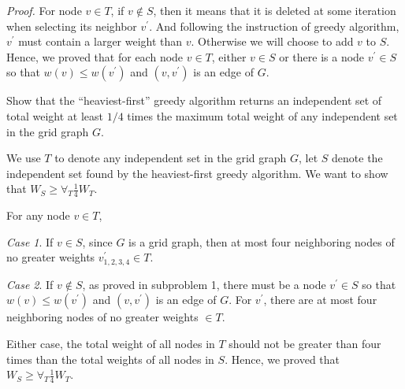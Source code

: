


\textit{Proof.} For node $v\in T$, if $v \notin S$, then it means that it is deleted at some iteration when selecting its neighbor $v^\prime$. And following the instruction of greedy algorithm, $v^\prime$ must contain a larger weight than $v$. Otherwise we will choose to add $v$ to $S$. Hence, we proved that for each node $v\in T$, either $v\in S$ or there is a node $v^\prime \in S$ so that $w(v) \le w(v^\prime)$ and $(v, v^\prime)$ is an edge of $G$.


Show that the “heaviest-first” greedy algorithm returns an independent set of total weight at least $1/4$ times the maximum total weight of any independent set in the grid graph $G$.






We use $T$ to denote any independent set in the grid graph $G$, let $S$ denote the independent set found by the heaviest-first greedy algorithm. We want to show that $W_S \ge \forall_{T} \frac{1}{4} W_{T}$.


For any node $v \in T$, 

\textit{Case 1}. If $v\in S$, since $G$ is a grid graph, then at most four neighboring nodes of no greater weights $v^\prime_{1, 2, 3, 4} \in T$.

\textit{Case 2}. If $v\notin S$, as proved in subproblem 1, there must be a node $v^\prime \in S$ so that $w(v) \le w(v^\prime)$ and $(v, v^\prime)$ is an edge of $G$. For $v^\prime$, there are at most four neighboring nodes of no greater weights $\in T$.

Either case, the total weight of all nodes in $T$ should not be greater than four times than the total weights of all nodes in $S$. Hence, we proved that $W_S \ge \forall_{T} \frac{1}{4} W_{T}$.










